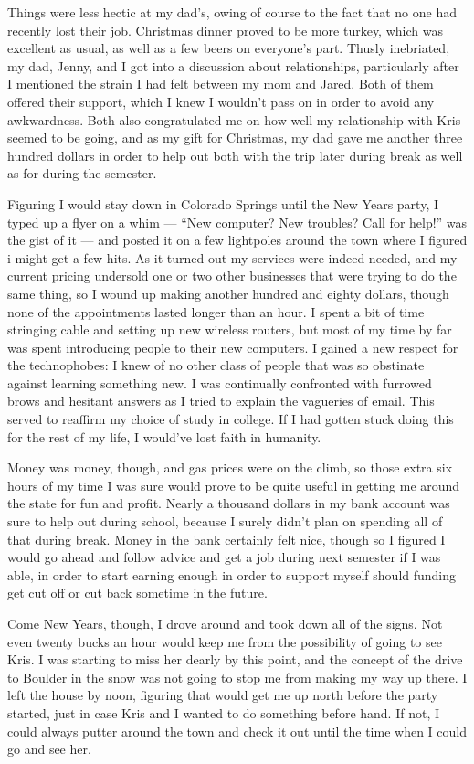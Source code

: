 Things were less hectic at my dad's, owing of course to the fact that no one had recently lost their job.  Christmas dinner proved to be more turkey, which was excellent as usual, as well as a few beers on everyone's part.  Thusly inebriated, my dad, Jenny, and I got into a discussion about relationships, particularly after I mentioned the strain I had felt between my mom and Jared.  Both of them offered their support, which I knew I wouldn't pass on in order to avoid any awkwardness.  Both also congratulated me on how well my relationship with Kris seemed to be going, and as my gift for Christmas, my dad gave me another three hundred dollars in order to help out both with the trip later during break as well as for during the semester.

Figuring I would stay down in Colorado Springs until the New Years party, I typed up a flyer on a whim --- ``New computer?  New troubles?  Call for help!'' was the gist of it --- and posted it on a few lightpoles around the town where I figured i might get a few hits.  As it turned out my services were indeed needed, and my current pricing undersold one or two other businesses that were trying to do the same thing, so I wound up making another hundred and eighty dollars, though none of the appointments lasted longer than an hour.  I spent a bit of time stringing cable and setting up new wireless routers, but most of my time by far was spent introducing people to their new computers.  I gained a new respect for the technophobes: I knew of no other class of people that was so obstinate against learning something new.  I was continually confronted with furrowed brows and hesitant answers as I tried to explain the vagueries of email.  This served to reaffirm my choice of study in college.  If I had gotten stuck doing this for the rest of my life, I would've lost faith in humanity.

Money was money, though, and gas prices were on the climb, so those extra six hours of my time I was sure would prove to be quite useful in getting me around the state for fun and profit.  Nearly a thousand dollars in my bank account was sure to help out during school, because I surely didn't plan on spending all of that during break.  Money in the bank certainly felt nice, though so I figured I would go ahead and follow advice and get a job during next semester if I was able, in order to start earning enough in order to support myself should funding get cut off or cut back sometime in the future.

Come New Years, though, I drove around and took down all of the signs.  Not even twenty bucks an hour would keep me from the possibility of going to see Kris.  I was starting to miss her dearly by this point, and the concept of the drive to Boulder in the snow was not going to stop me from making my way up there.  I left the house by noon, figuring that would get me up north before the party started, just in case Kris and I wanted to do something before hand.  If not, I could always putter around the town and check it out until the time when I could go and see her.

